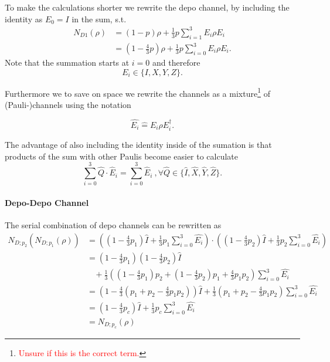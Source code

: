 To make the calculations shorter we rewrite the depo channel, 
by including the identity as $E_0=I$ in the sum, s.t. 
\begin{align*}
    N_{D1}(\rho)    &= (1-p) \rho  + \frac{1}{3} p \sum_{i=1}^3 E_i \rho E_i \\
                    &= (1-\frac{4}{3}p)\rho + \frac{1}{3} p \sum_{i=0}^{3} E_i \rho E_i.
\end{align*}
Note that the summation starts at $i=0$ and therefore 
\begin{equation*}
    E_i \in \{ I, X, Y, Z\}. 
\end{equation*}

Furthermore we to save on space we rewrite the channels as a mixture\footnote{
    \textcolor{red}{Unsure if this is the correct term.}} 
of (Pauli-)channels using the notation

\begin{equation*}
    \hat{E_i} \hat{=} E_i \rho E_i^\dag.
\end{equation*}

The advantage of also including the identity inside of the sumation is that products of the sum with other Paulis become easier to calculate
\begin{equation}
    \sum_{i=0}^{3} \hat{Q} \cdot \hat{E}_i = \sum_{i=0}^{3} \hat{E}_i\ , \forall \hat{Q} \in \{ \hat{I}, \hat{X}, \hat{Y}, \hat{Z}\}. 
    \label{eq:sum_trick}
\end{equation}


\paragraph{Depo-Depo Channel}

The serial combination of depo channels can be rewritten as 
\begin{align*}
    N_{D;p_2}(N_{D;p_1}(\rho)) &= \left( \left(1-\frac{4}{3}p_1\right) \hat{I} + \frac{1}{3} p_1 \sum_{i=0}^{3}\hat{E_i} \right)
    \cdot \left( \left(1-\frac{4}{3}p_2\right) \hat{I} + \frac{1}{3} p_2 \sum_{i=0}^{3}\hat{E_i} \right) \\
    &= \left(1-\frac{4}{3}p_1\right)\left(1-\frac{4}{3}p_2\right) \hat{I} \\
    &  \ \ \ \ + \frac{1}{3}\left((1-\frac{4}{3}p_1)p_2 + (1-\frac{4}{3}p_2)p_1 + \frac{4}{3}p_1 p_2\right) \sum_{i=0}^{3} \hat{E_i} \\
    &= \left( 1- \frac{4}{3}\left( p_1 + p_2 - \frac{4}{3}p_1 p_2\right) \right) \hat{I} 
    + \frac{1}{3} \left( p_1 + p_2 - \frac{4}{3}p_1 p_2\right) \sum_{i=0}^{3} \hat{E_i} \\
    &= (1-\frac{4}{3}p_c)\hat{I} + \frac{1}{3} p_c \sum_{i=0}^{3} \hat{E_i}\\
    &= N_{D;p_c}(\rho)
\end{align*}

